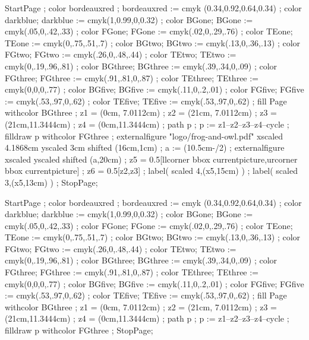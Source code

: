 	StartPage ;
		color bordeauxred ; bordeauxred := cmyk (0.34,0.92,0.64,0.34) ;
		color darkblue; darkblue := cmyk(1,0.99,0,0.32) ;
		color BGone; BGone := cmyk(.05,0,.42,.33) ;
		color FGone; FGone := cmyk(.02,0,.29,.76) ;
		color TEone; TEone := cmyk(0,.75,.51,.7) ;
		color BGtwo; BGtwo := cmyk(.13,0,.36,.13) ;
		color FGtwo; FGtwo := cmyk(.26,0,.48,.44) ;
		color TEtwo; TEtwo := cmyk(0,.19,.96,.81) ;
		color BGthree; BGthree := cmyk(.39,.34,0,.09) ;
		color FGthree; FGthree := cmyk(.91,.81,0,.87) ;
		color TEthree; TEthree := cmyk(0,0,0,.77) ;
		color BGfive; BGfive := cmyk(.11,0,.2,.01) ;
		color FGfive; FGfive := cmyk(.53,.97,0,.62) ;
		color TEfive; TEfive := cmyk(.53,.97,0,.62) ;
		fill Page withcolor BGthree ;
		z1 = (0cm, 7.0112cm) ;
		z2 = (21cm, 7.0112cm) ;
		z3 = (21cm,11.3444cm) ;
		z4 = (0cm,11.3444cm) ;
		path p ; p := z1--z2--z3--z4--cycle ;
		filldraw p withcolor FGthree ;
		externalfigure "logo/frog-and-owl.pdf" xscaled 4.1868cm yscaled 3cm shifted (16cm,1cm) ;
		a := (10.5cm-/2) ;
		externalfigure  xscaled  yscaled  shifted (a,20cm) ;
		z5 = 0.5[llcorner bbox currentpicture,urcorner bbox currentpicture] ;
        z6 = 0.5[z2,z3] ;
		label( scaled 4,(x5,15cm) ) ;
		label( scaled 3,(x5,13cm) ) ;
	StopPage;
\stopuseMPgraphic

    StartPage ;
        color bordeauxred ; bordeauxred := cmyk (0.34,0.92,0.64,0.34) ;
        color darkblue; darkblue := cmyk(1,0.99,0,0.32) ;
		color BGone; BGone := cmyk(.05,0,.42,.33) ;
		color FGone; FGone := cmyk(.02,0,.29,.76) ;
		color TEone; TEone := cmyk(0,.75,.51,.7) ;
		color BGtwo; BGtwo := cmyk(.13,0,.36,.13) ;
		color FGtwo; FGtwo := cmyk(.26,0,.48,.44) ;
		color TEtwo; TEtwo := cmyk(0,.19,.96,.81) ;
		color BGthree; BGthree := cmyk(.39,.34,0,.09) ;
		color FGthree; FGthree := cmyk(.91,.81,0,.87) ;
		color TEthree; TEthree := cmyk(0,0,0,.77) ;
		color BGfive; BGfive := cmyk(.11,0,.2,.01) ;
		color FGfive; FGfive := cmyk(.53,.97,0,.62) ;
		color TEfive; TEfive := cmyk(.53,.97,0,.62) ;
        fill Page withcolor BGthree ;
        z1 = (0cm, 7.0112cm) ;
        z2 = (21cm, 7.0112cm) ;
        z3 = (21cm,11.3444cm) ;
        z4 = (0cm,11.3444cm) ;
        path p ; p := z1--z2--z3--z4--cycle ;
		filldraw p withcolor FGthree ;
    StopPage;
\stopuseMPgraphic


\stopenvironment
